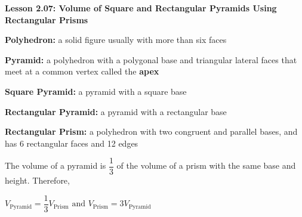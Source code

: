 \begin{center}
\textbf{Lesson 2.07: Volume of Square and Rectangular Pyramids Using Rectangular Prisms}
\end{center}

\vspace*{-1.5ex}

\textbf{Polyhedron:} a solid figure usually with more than six faces

\textbf{Pyramid:} a polyhedron with a polygonal base and triangular lateral faces that meet at a common vertex called the \textbf{apex}

\textbf{Square Pyramid:} a pyramid with a square base

\textbf{Rectangular Pyramid:} a pyramid with a rectangular base

\textbf{Rectangular Prism:} a polyhedron with two congruent and parallel bases, and has 6 rectangular faces and 12 edges

The volume of a pyramid is \(\dfrac{1}{3}\) of the volume of a prism with the same base and height. Therefore,

{\centering $ V_{\text{Pyramid}} = \dfrac{1}{3}V_{\text{Prism}} \text{ and } V_{\text{Prism}} = 3 V_{\text{Pyramid}}  $\par}
